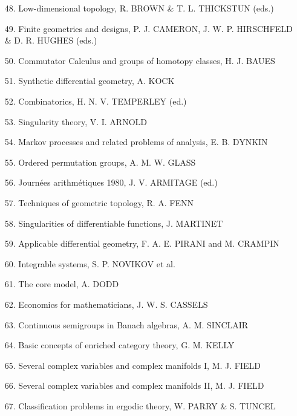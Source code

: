 \begin{enumerate}[leftmargin=2.5em,itemsep=2pt,parsep=0pt]
\item[48.] Low-dimensional topology, R. BROWN \& T. L. THICKSTUN (eds.)
\item[49.] Finite geometries and designs, P. J. CAMERON, J. W. P. HIRSCHFELD \& D. R. HUGHES (eds.)
\item[50.] Commutator Calculus and groups of homotopy classes, H. J. BAUES
\item[51.] Synthetic differential geometry, A. KOCK
\item[52.] Combinatorics, H. N. V. TEMPERLEY (ed.)
\item[53.] Singularity theory, V. I. ARNOLD
\item[54.] Markov processes and related problems of analysis, E. B. DYNKIN
\item[55.] Ordered permutation groups, A. M. W. GLASS
\item[56.] Journ\'ees arithm\'etiques 1980, J. V. ARMITAGE (ed.)
\item[57.] Techniques of geometric topology, R. A. FENN
\item[58.] Singularities of differentiable functions, J. MARTINET
\item[59.] Applicable differential geometry, F. A. E. PIRANI and M. CRAMPIN
\item[60.] Integrable systems, S. P. NOVIKOV et al.
\item[61.] The core model, A. DODD
\item[62.] Economics for mathematicians, J. W. S. CASSELS
\item[63.] Continuous semigroups in Banach algebras, A. M. SINCLAIR
\item[64.] Basic concepts of enriched category theory, G. M. KELLY
\item[65.] Several complex variables and complex manifolds I, M. J. FIELD
\item[66.] Several complex variables and complex manifolds II, M. J. FIELD
\item[67.] Classification problems in ergodic theory, W. PARRY \& S. TUNCEL
\end{enumerate}
\endgroup

